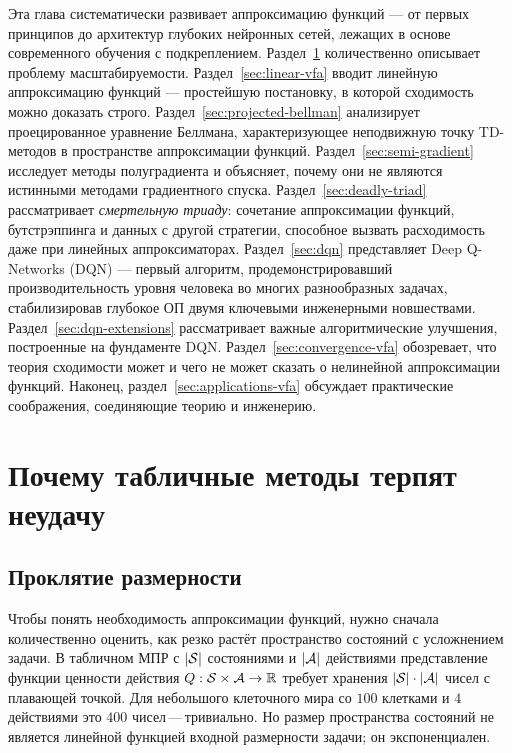 Эта глава систематически развивает аппроксимацию функций --- от первых принципов до архитектур глубоких нейронных сетей, лежащих в основе современного обучения с подкреплением.  Раздел~\ref{sec:tabular-fail} количественно описывает проблему масштабируемости.  Раздел~\ref{sec:linear-vfa} вводит линейную аппроксимацию функций --- простейшую постановку, в которой сходимость можно доказать строго.  Раздел~\ref{sec:projected-bellman} анализирует проецированное уравнение Беллмана, характеризующее неподвижную точку TD-методов в пространстве аппроксимации функций.  Раздел~\ref{sec:semi-gradient} исследует методы полуградиента и объясняет, почему они не являются истинными методами градиентного спуска.  Раздел~\ref{sec:deadly-triad} рассматривает \emph{смертельную триаду}: сочетание аппроксимации функций, бутстрэппинга и данных с другой стратегии, способное вызвать расходимость даже при линейных аппроксиматорах.  Раздел~\ref{sec:dqn} представляет Deep Q-Networks (DQN) --- первый алгоритм, продемонстрировавший производительность уровня человека во многих разнообразных задачах, стабилизировав глубокое ОП двумя ключевыми инженерными новшествами.  Раздел~\ref{sec:dqn-extensions} рассматривает важные алгоритмические улучшения, построенные на фундаменте DQN.  Раздел~\ref{sec:convergence-vfa} обозревает, что теория сходимости может и чего не может сказать о нелинейной аппроксимации функций.  Наконец, раздел~\ref{sec:applications-vfa} обсуждает практические соображения, соединяющие теорию и инженерию.

\section{Почему табличные методы терпят неудачу}
\label{sec:tabular-fail}

\subsection{Проклятие размерности}

Чтобы понять необходимость аппроксимации функций, нужно сначала количественно оценить, как резко растёт пространство состояний с усложнением задачи.  В табличном МПР с $|\mathcal{S}|$ состояниями и $|\mathcal{A}|$ действиями представление функции ценности действия $Q : \mathcal{S} \times \mathcal{A} \to \mathbb{R}$ требует хранения $|\mathcal{S}| \cdot |\mathcal{A}|$ чисел с плавающей точкой.  Для небольшого клеточного мира со $100$ клетками и $4$ действиями это $400$ чисел\,---\,тривиально.  Но размер пространства состояний не является линейной функцией входной размерности задачи; он экспоненциален.

